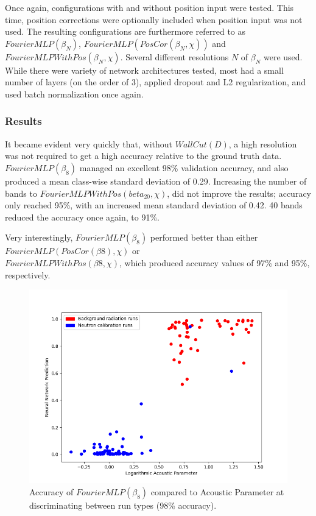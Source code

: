 \documentclass[10pt]{article}
\begin{document}
Once again, configurations with and without position input were tested. This time, position corrections were optionally included when position input was not used. The resulting configurations are furthermore referred to as $FourierMLP(\beta_{N})$, $FourierMLP(PosCor(\beta_{N}, \chi))$ and $FourierMLPWithPos(\beta_{N}, \chi)$. Several different resolutions $N$ of $\beta_{N}$ were used. While there were variety of network architectures tested, most had a small number of layers (on the order of 3), applied dropout and L2 regularization, and used batch normalization once again.

\subsubsection{Results}

It became evident very quickly that, without $WallCut(D)$, a high resolution was not required to get a high accuracy relative to the ground truth data. $FourierMLP(\beta_{8})$ managed an excellent 98\% validation accuracy, and also produced a mean class-wise standard deviation of 0.29. Increasing the number of bands to $FourierMLPWithPos(beta_{20}, \chi)$, did not improve the results; accuracy only reached 95\%, with an increased mean standard deviation of 0.42. 40 bands reduced the accuracy once again, to 91\%.

Very interestingly, $FourierMLP(\beta_{8})$ performed better than either $FourierMLP(PosCor(\beta{8}), \chi)$ or \\ $FourierMLPWithPos(\beta{8}, \chi)$, which produced accuracy values of 97\% and 95\%, respectively.

\begin{figure}[h]
    \centering
    \includegraphics[width=\textwidth]{fourier_mlp_no_correction}
    \caption{\label{fourier_mlp_no_correction} Accuracy of $FourierMLP(\beta_{8})$ compared to Acoustic Parameter at discriminating between run types (98\% accuracy).}
\end{figure}
\end{document}
